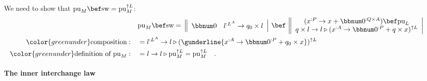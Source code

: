 We need to show that $\text{pu}_{M}\bef\text{sw}=\text{pu}_{M}^{\uparrow L}$:
\begin{align*}
 & \text{pu}_{M}\bef\text{sw}=\,\left\Vert \begin{array}{cc}
\bbnum 0 & l^{:L^{A}}\rightarrow q_{0}\times l\end{array}\right|\,\bef\,\left\Vert \begin{array}{c}
(x^{:P}\rightarrow x+\bbnum 0^{:Q\times A})\bef\text{pu}_{L}\\
q\times l\rightarrow l\triangleright(x^{:A}\rightarrow\bbnum 0^{:P}+q\times x)^{\uparrow L}
\end{array}\right|\\
{\color{greenunder}\text{composition}:}\quad & =l^{:L^{A}}\rightarrow l\triangleright(\gunderline{x^{:A}\rightarrow\bbnum 0^{:P}+q_{0}\times x})^{\uparrow L}\\
{\color{greenunder}\text{definition of }\text{pu}_{M}:}\quad & =l\rightarrow l\triangleright\text{pu}_{M}^{\uparrow L}=\text{pu}_{M}^{\uparrow L}\quad.
\end{align*}


\paragraph{The inner interchange law}

